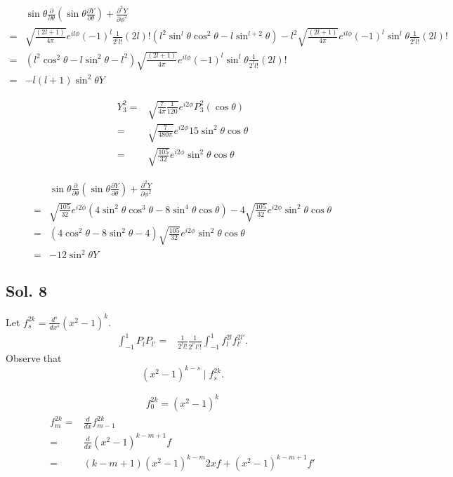 \begin{align*}
    &\sin\theta\frac{\partial}{\partial \theta}
    \left(\sin\theta\frac{\partial Y}{\partial\theta}\right)
    +\frac{\partial^2Y}{\partial\phi^2}\\
    =&
    \sqrt{\frac{(2l+1)}{4\pi}}e^{il\phi}
    (-1)^l
    \frac{1}{2^ll!}(2l)!
    (l^2\sin^l\theta\cos^2\theta - l\sin^{l+2}\theta)
    -l^2\sqrt{\frac{(2l+1)}{4\pi}}e^{il\phi}
    (-1)^l\sin^l\theta
    \frac{1}{2^ll!}(2l)!\\
    =&(l^2\cos^2\theta-l\sin^2\theta-l^2)\sqrt{\frac{(2l+1)}{4\pi}}e^{il\phi}
    (-1)^l\sin^l\theta
    \frac{1}{2^ll!}(2l)!\\
    =&-l(l+1)\sin^2\theta Y
\end{align*}

\begin{align*}
    Y_3^2 = &
    \sqrt{\frac{7}{4\pi}\frac{1}{120}}
    e^{i2\phi}P^2_3(\cos\theta)\\
    =&\sqrt{\frac{7}{480\pi}}e^{i2\phi}
    15\sin^2\theta\cos\theta\\
    =&\sqrt{\frac{105}{32}}e^{i2\phi}\sin^2\theta\cos\theta
\end{align*}

\begin{align*}
    &\sin\theta\frac{\partial}{\partial \theta}
    \left(\sin\theta\frac{\partial Y}{\partial\theta}\right)
    +\frac{\partial^2Y}{\partial\phi^2}\\
    =&\sqrt{\frac{105}{32}}e^{i2\phi}
    (4\sin^2\theta\cos^3\theta-8\sin^4\theta\cos\theta)
    -4\sqrt{\frac{105}{32}}e^{i2\phi}\sin^2\theta\cos\theta\\
    =&(4\cos^2\theta-8\sin^2\theta-4)\sqrt{\frac{105}{32}}e^{i2\phi}\sin^2\theta\cos\theta\\
    =&-12\sin^2\theta Y
\end{align*}



\subsection*{Sol. 8}
Let $f^{2k}_s = \frac{d^s}{dx^s}(x^2-1)^k.$ 
\begin{align*}
    \int_{-1}^{1}
    P_lP_{l'}=&
    \frac{1}{2^ll!}
    \frac{1}{2^{l'}l'!}
    \int_{-1}^1
    f_l^{2l}f_{l'}^{2l'}.
\end{align*}
Observe that
$$
(x^2-1)^{k-s}\mid f^{2k}_s.
$$ 

\begin{align*}
    f^{2k}_0=(x^2-1)^k
\end{align*}
\begin{align*}
    f^{2k}_m=&\frac{d}{dx}f^{2k}_{m-1}\\
    =&\frac{d}{dx}(x^2-1)^{k-m+1}f\\
    =&(k-m+1)(x^2-1)^{k-m}2xf + (x^2-1)^{k-m+1}f'
\end{align*}

